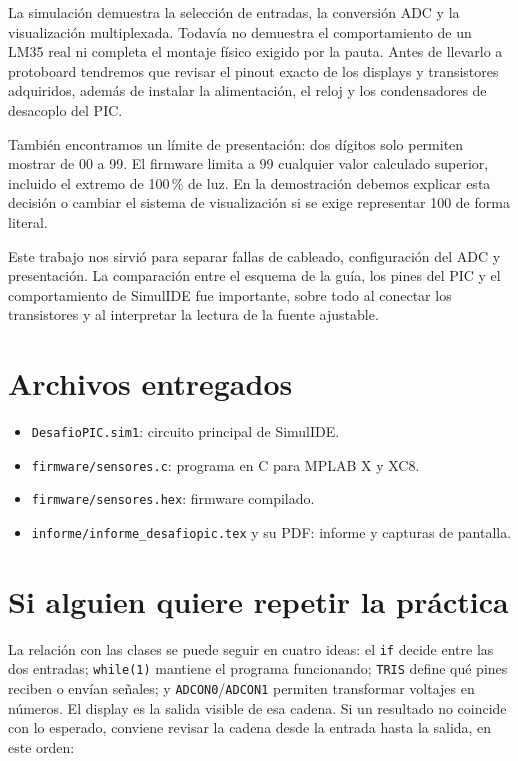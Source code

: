 \documentclass[11pt,a4paper]{article}
\begin{document}
La simulación demuestra la selección de entradas, la conversión ADC y la visualización multiplexada. Todavía no demuestra el comportamiento de un LM35 real ni completa el montaje físico exigido por la pauta. Antes de llevarlo a protoboard tendremos que revisar el pinout exacto de los displays y transistores adquiridos, además de instalar la alimentación, el reloj y los condensadores de desacoplo del PIC.

También encontramos un límite de presentación: dos dígitos solo permiten mostrar de 00 a 99. El firmware limita a 99 cualquier valor calculado superior, incluido el extremo de 100\,\% de luz. En la demostración debemos explicar esta decisión o cambiar el sistema de visualización si se exige representar 100 de forma literal.

Este trabajo nos sirvió para separar fallas de cableado, configuración del ADC y presentación. La comparación entre el esquema de la guía, los pines del PIC y el comportamiento de SimulIDE fue importante, sobre todo al conectar los transistores y al interpretar la lectura de la fuente ajustable.

\section*{Archivos entregados}

\begin{itemize}
  \item \texttt{DesafioPIC.sim1}: circuito principal de SimulIDE.
  \item \texttt{firmware/sensores.c}: programa en C para MPLAB X y XC8.
  \item \texttt{firmware/sensores.hex}: firmware compilado.
  \item \texttt{informe/informe\_desafiopic.tex} y su PDF: informe y capturas de pantalla.
\end{itemize}

\newpage
\section*{Si alguien quiere repetir la práctica}

La relación con las clases se puede seguir en cuatro ideas: el \texttt{if} decide entre las dos entradas; \texttt{while(1)} mantiene el programa funcionando; \texttt{TRIS} define qué pines reciben o envían señales; y \texttt{ADCON0}/\texttt{ADCON1} permiten transformar voltajes en números. El display es la salida visible de esa cadena. Si un resultado no coincide con lo esperado, conviene revisar la cadena desde la entrada hasta la salida, en este orden:
\end{document}
